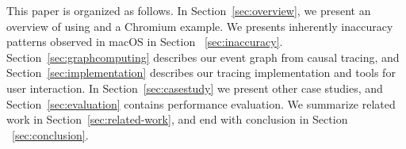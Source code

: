 
This paper is organized as follows. In Section~\ref{sec:overview}, we present
an overview of using \xxx and a Chromium example.
We presents inherently inaccuracy patterns observed in macOS in Section
~\ref{sec:inaccuracy}.
Section~\ref{sec:graphcomputing} describes our event graph from causal tracing,
and Section~\ref{sec:implementation} describes our
tracing implementation and tools for user interaction.
In Section~\ref{sec:casestudy} we present other case
studies, and Section~\ref{sec:evaluation} contains performance evaluation.
We summarize related work in Section~\ref{sec:related-work}, and end with
conclusion in Section ~\ref{sec:conclusion}.
